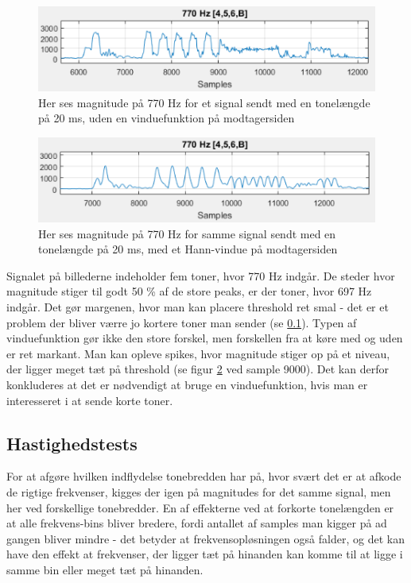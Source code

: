 \begin{figure}[h]
\centering
\includegraphics[scale=0.8]{Billeder/NoWindow.PNG}
\caption{Her ses magnitude på 770 Hz for et signal sendt med en tonelængde på 20 ms, uden en vinduefunktion på modtagersiden}
\label{fig:NoWindow}
\end{figure}

\begin{figure}[h]
\centering
\includegraphics[scale=0.8]{Billeder/HannWindow.PNG}
\caption{Her ses magnitude på 770 Hz for samme signal sendt med en tonelængde på 20 ms, med et Hann-vindue på modtagersiden}
\label{fig:NoWindow}
\end{figure}

Signalet på billederne indeholder fem toner, hvor 770 Hz indgår. De steder hvor magnitude stiger til godt 50 \% af de store peaks, er der toner, hvor 697 Hz indgår. Det gør margenen, hvor man kan placere threshold ret smal - det er et problem der bliver værre jo kortere toner man sender (se \ref{sec:hastighedstest}). Typen af vinduefunktion gør ikke den store forskel, men forskellen fra at køre med og uden er ret markant. Man kan opleve spikes, hvor magnitude stiger op på et niveau, der ligger meget tæt på threshold (se figur \ref{fig:NoWindow} ved sample 9000). Det kan derfor konkluderes at det er nødvendigt at bruge en vinduefunktion, hvis man er interesseret i at sende korte toner.

\subsection{Hastighedstests} \label{sec:hastighedstest}

For at afgøre hvilken indflydelse tonebredden har på, hvor svært det er at afkode de rigtige frekvenser, kigges der igen på magnitudes for det samme signal, men her ved forskellige tonebredder. En af effekterne ved at forkorte tonelængden er at alle frekvens-bins bliver bredere, fordi antallet af samples man kigger på ad gangen bliver mindre - det betyder at frekvensopløsningen også falder, og det kan have den effekt at frekvenser, der ligger tæt på hinanden kan komme til at ligge i samme bin eller meget tæt på hinanden. 

